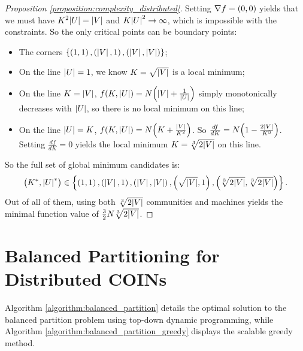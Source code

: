 \begin{proof}[Proposition \ref{proposition:complexity_distributed}]
    Setting $\nabla f = \mathopen{}\left(0, 0\right)$ yields that we must have $K^2\mathopen{}\left|U\right|=\mathopen{}\left|V\right|$ and $K\mathopen{}\left|U\right|^2 \to \infty$, which is impossible with the constraints. So the only critical points can be boundary points:
    \begin{itemize}
        \item The corners $\mathopen{}\left\{\mathopen{}\left(1, 1\right), \mathopen{}\left(\mathopen{}\left|V\right|, 1\right), \mathopen{}\left(\mathopen{}\left|V\right|,\mathopen{}\left|V\right|\right)\right\}$;
        \item On the line $\mathopen{}\left|U\right|=1$, we know $K=\sqrt{\mathopen{}\left|V\right|}$ is a local minimum;
        \item On the line $K=\mathopen{}\left|V\right|$, $f\mathopen{}\left(K, \mathopen{}\left|U\right|\right)=N\mathopen{}\left(\mathopen{}\left|V\right|+\frac{1}{\mathopen{}\left|U\right|}\right)$ simply monotonically decreases with $\mathopen{}\left|U\right|$, so there is no local minimum on this line;
        \item On the line $\mathopen{}\left|U\right|=K$, $f\mathopen{}\left(K, \mathopen{}\left|U\right|\right)=N\mathopen{}\left(K+\frac{\mathopen{}\left|V\right|}{K^2}\right)$. So $\frac{d f}{d K}=N\mathopen{}\left(1-\frac{2\mathopen{}\left|V\right|}{K^3}\right)$. Setting $\frac{d f}{d K}=0$ yields the local minimum $K=\sqrt[3]{2\mathopen{}\left|V\right|}$ on this line.
    \end{itemize}
    So the full set of global minimum candidates is: 
    \begin{equation}
        \mathopen{}\left(K^*, \mathopen{}\left|U\right|^*\right) \in \mathopen{}\left\{\mathopen{}\left(1, 1\right), \mathopen{}\left(\mathopen{}\left|V\right|, 1\right), \mathopen{}\left(\mathopen{}\left|V\right|,\mathopen{}\left|V\right|\right), \mathopen{}\left(\sqrt{\mathopen{}\left|V\right|}, 1\right), \mathopen{}\left(\sqrt[3]{2\mathopen{}\left|V\right|}, \sqrt[3]{2\mathopen{}\left|V\right|}\right) \right\}.
    \end{equation}
    Out of all of them, using both $\sqrt[3]{2\mathopen{}\left|V\right|}$ communities and machines yields the minimal function value of $\frac{3}{2}N\sqrt[3]{2\mathopen{}\left|V\right|}$.
\end{proof}

\section{Balanced Partitioning for Distributed COINs}
\label{sec:appendix_balanced_partition_algs}

Algorithm \ref{algorithm:balanced_partition} details the optimal solution to the balanced partition problem using top-down dynamic programming, while Algorithm \ref{algorithm:balanced_partition_greedy} displays the scalable greedy method.

